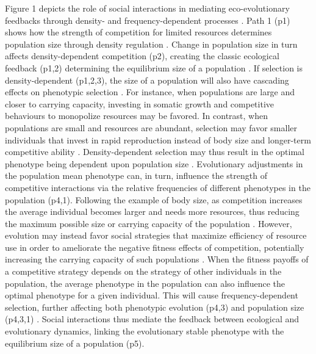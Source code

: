\documentclass{article}
\begin{document}
\noindent Figure 1 depicts the role of social interactions in mediating eco-evolutionary feedbacks through density- and frequency-dependent processes \citep{Engen2020}. Path 1 (p1) shows how the strength of competition for limited resources determines population size through density regulation \citep{Gilpin1973a}. Change in population size in turn affects density-dependent competition (p2), creating the classic ecological feedback (p1,2) determining the equilibrium size of a population \citep{Travis2013}. If selection is density-dependent (p1,2,3), the size of a population will also have cascading effects on phenotypic selection  \citep{Mueller1997, Boyce1984}. For instance, when populations are large and closer to carrying capacity, investing in somatic growth and competitive behaviours to monopolize resources may be favored. In contrast, when populations are small and resources are abundant, selection may favor smaller individuals that invest in rapid reproduction instead of body size and longer-term competitive ability \citep{Joshi2001, Wright2018, Engen2017}. Density-dependent selection may thus result in the optimal phenotype being dependent upon population size \citep{Anderson1971, Charlesworth1971}. Evolutionary adjustments in the population mean phenotype can, in turn, influence the strength of competitive interactions via the relative frequencies of different phenotypes in the population \citep{Wright1969} (p4,1). Following the example of body size, as competition increases the average individual becomes larger and needs more resources, thus reducing the maximum possible size or carrying capacity of the population \citep{Engen2020}. However, evolution may instead favor social strategies that maximize efficiency of resource use in order to ameliorate the negative fitness effects of competition, potentially increasing the carrying capacity of such populations \citep{macarthur1967theory,  Boyce1984}. When the fitness payoffs of a competitive strategy depends on the strategy of other individuals in the population, the average phenotype in the population can also influence the optimal phenotype for a given individual. This will cause frequency-dependent selection, further affecting both phenotypic evolution (p4,3) \citep{Heino1998} and population size (p4,3,1) \citep{Svensson2018}. Social interactions thus mediate the feedback between ecological and evolutionary dynamics, linking the evolutionary stable phenotype with the equilibrium size of a population (p5).
\end{document}

